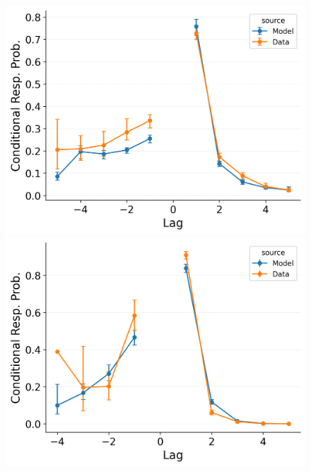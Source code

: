 \documentclass[
  man,
  floatsintext,
  longtable,
  nolmodern,
  notxfonts,
  notimes,
  draftfirst,
  colorlinks=true,linkcolor=blue,citecolor=blue,urlcolor=blue]{apa7}
\begin{document}
\begin{figure}
%
\begin{minipage}{0.33\linewidth}
\includegraphics{figures/Gordon2021_BaseCRU_with_ContextTerm_Confusable_Fitting_crp_LL7.png}\end{minipage}%
\newline
\begin{minipage}{0.33\linewidth}
\includegraphics{figures/Gordon2021_CRU_with_Pre-Expt_and_Primacy__and_ContextTerm_Confusable_Fitting_crp_LL5.png}\end{minipage}%
%
\begin{minipage}{0.33\linewidth}

\end{minipage}
\end{figure}
\end{document}
